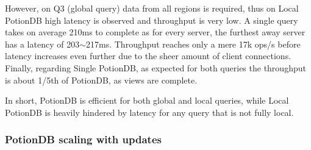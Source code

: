 \documentclass[sigconf, nonacm]{acmart}
\begin{document}
However, on Q3 (global query) data from all regions is required, thus on Local PotionDB high latency is observed and throughput is very low.
A single query takes on average 210ms to complete as for every server, the furthest away server has a latency of 203$\sim$217ms.
Throughput reaches only a mere 17k ops/s before latency increases even further due to the sheer amount of client connections.
Finally, regarding Single PotionDB, as expected for both queries the throughput is about 1/5th of PotionDB, as views are complete.

In short, PotionDB is efficient for both global and local queries, while Local PotionDB is heavily hindered by latency for any query that is not fully local.

%
%
%

\subsubsection{PotionDB scaling with updates}
\end{document}
